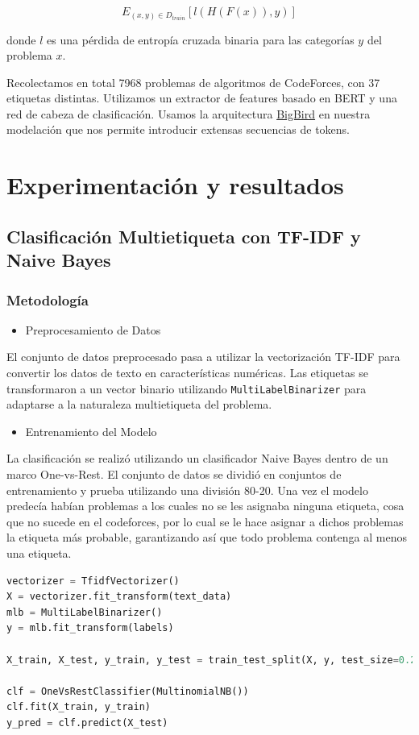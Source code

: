 \documentclass{article}
\begin{document}
$$
    E_{(x, y) \in D_{train}} [ l(H(F(x)), y) ]
$$

donde $l$ es una pérdida de entropía cruzada binaria para las categorías $y$ del problema $x$.

Recolectamos en total 7968 problemas de algoritmos de CodeForces, con 37 etiquetas distintas. 
Utilizamos un extractor de features basado en BERT y una red de cabeza de 
clasificación. Usamos la arquitectura \href{https://huggingface.co/google/bigbird-roberta-base}{BigBird}
en nuestra modelación que nos permite introducir extensas secuencias de tokens.

\section{Experimentación y resultados}

\subsection{Clasificación Multietiqueta con TF-IDF y Naive Bayes}
\subsubsection{Metodología}
\begin{itemize}
    \item Preprocesamiento de Datos
\end{itemize}
El conjunto de datos preprocesado pasa a utilizar la vectorización TF-IDF para convertir los datos de texto en características numéricas. Las etiquetas se transformaron a un vector binario utilizando \texttt{MultiLabelBinarizer} para adaptarse a la naturaleza multietiqueta del problema.

\begin{itemize}
    \item Entrenamiento del Modelo
\end{itemize}
La clasificación se realizó utilizando un clasificador Naive Bayes dentro de un marco One-vs-Rest. El conjunto de datos se dividió en conjuntos de entrenamiento y prueba utilizando una división 80-20. Una vez el modelo predecía habían problemas a los cuales no se les
asignaba ninguna etiqueta, cosa que no sucede en el codeforces, por lo cual se le hace asignar a dichos problemas la etiqueta más probable, garantizando así que todo problema contenga al menos una etiqueta.

\begin{lstlisting}[language=Python, caption=Naive Bayes]
vectorizer = TfidfVectorizer()
X = vectorizer.fit_transform(text_data)
mlb = MultiLabelBinarizer()
y = mlb.fit_transform(labels)

X_train, X_test, y_train, y_test = train_test_split(X, y, test_size=0.2, random_state=42)

clf = OneVsRestClassifier(MultinomialNB())
clf.fit(X_train, y_train)
y_pred = clf.predict(X_test)
\end{lstlisting}
\newpage
\end{document}
